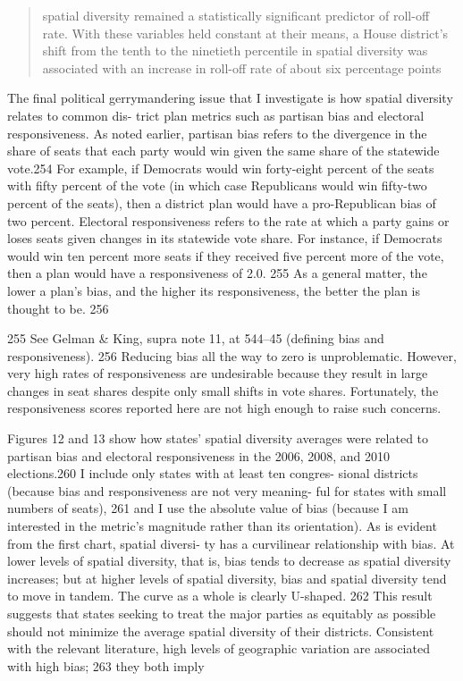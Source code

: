 \documentclass[]{article}
\begin{document}
\begin{quote}
spatial diversity remained a statistically significant predictor of
roll-off rate. With these variables held constant at their means, a
House district's shift from the tenth to the ninetieth percentile in
spatial diversity was associated with an increase in roll-off rate of
about six percentage points
\end{quote}

The final political gerrymandering issue that I investigate is how
spatial diversity relates to common dis- trict plan metrics such as
partisan bias and electoral responsiveness. As noted earlier, partisan
bias refers to the divergence in the share of seats that each party
would win given the same share of the statewide vote.254 For example, if
Democrats would win forty-eight percent of the seats with fifty percent
of the vote (in which case Republicans would win fifty-two percent of
the seats), then a district plan would have a pro-Republican bias of two
percent. Electoral responsiveness refers to the rate at which a party
gains or loses seats given changes in its statewide vote share. For
instance, if Democrats would win ten percent more seats if they received
five percent more of the vote, then a plan would have a responsiveness
of 2.0. 255 As a general matter, the lower a plan's bias, and the higher
its responsiveness, the better the plan is thought to be. 256

255 See Gelman \& King, supra note 11, at 544--45 (defining bias and
responsiveness). 256 Reducing bias all the way to zero is unproblematic.
However, very high rates of responsiveness are undesirable because they
result in large changes in seat shares despite only small shifts in vote
shares. Fortunately, the responsiveness scores reported here are not
high enough to raise such concerns.

Figures 12 and 13 show how states' spatial diversity averages were
related to partisan bias and electoral responsiveness in the 2006, 2008,
and 2010 elections.260 I include only states with at least ten congres-
sional districts (because bias and responsiveness are not very meaning-
ful for states with small numbers of seats), 261 and I use the absolute
value of bias (because I am interested in the metric's magnitude rather
than its orientation). As is evident from the first chart, spatial
diversi- ty has a curvilinear relationship with bias. At lower levels of
spatial diversity, that is, bias tends to decrease as spatial diversity
increases; but at higher levels of spatial diversity, bias and spatial
diversity tend to move in tandem. The curve as a whole is clearly
U-shaped. 262 This result suggests that states seeking to treat the
major parties as equitably as possible should not minimize the average
spatial diversity of their districts. Consistent with the relevant
literature, high levels of geographic variation are associated with high
bias; 263 they both imply
\end{document}

